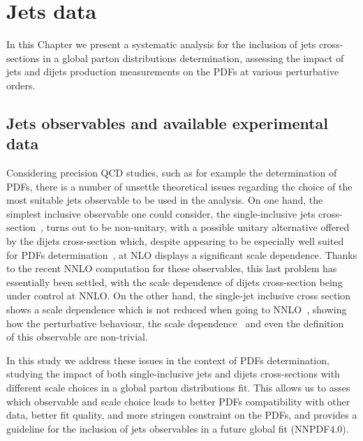 \chapter{Jets data}
\label{ch:jets}
In this Chapter we present a systematic analysis for the inclusion 
of jets cross-sections in a global parton distributions determination,
assessing the impact of jets and dijets production measurements on the PDFs at various perturbative orders.

\section{Jets observables and available experimental data}
Considering precision QCD studies, such as for example the determination of PDFs, 
there is a number of unsettle theoretical issues regarding the choice of the most suitable jets observable
to be used in the analysis. 
On one hand, the simplest inclusive observable one could consider, 
the single-inclusive jets cross-section~\cite{Ellis:1990ek,Aversa:1988fv}, turns out to be non-unitary,
with a possible unitary alternative offered by the dijets cross-section which, despite appearing to be 
especially well suited for PDFs determination~\cite{Giele:1994xd}, at NLO displays a significant scale dependence. 
Thanks to the recent NNLO computation for these observables, this last problem has essentially been settled,
with the scale dependence of dijets cross-section being under control at NNLO.
On the other hand, the single-jet inclusive cross section
shows a scale dependence which is not reduced when going to NNLO~\cite{Currie:2017ctp}, 
showing how the perturbative behaviour, the scale dependence~\cite{Currie:2018xkj} and even the definition~\cite{Cacciari:2019qjx} 
of this observable are non-trivial.  

%
In this study we address these issues in the context of PDFs determination, studying the impact of both single-inclusive
jets and dijets cross-sections with different scale choices in a global parton distributions fit. 
This allows us to asses which observable and scale choice leads to better PDFs compatibility with other data, better fit quality,
and more stringen constraint on the PDFs, and provides a guideline for the inclusion of jets observables in a future
global fit (NNPDF4.0).